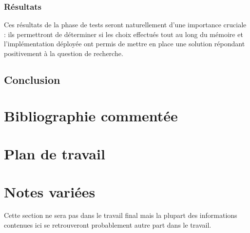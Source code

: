 \documentclass[11pt]{article}
\begin{document}
\subsubsection{Résultats}
Ces résultats de la phase de tests seront naturellement d'une importance cruciale : ils permettront de déterminer si les choix effectués tout au long du mémoire et l'implémentation déployée ont permis de mettre en place une solution répondant positivement à la question de recherche.
\subsection{Conclusion}

\section{Bibliographie commentée}

\section{Plan de travail}

\section{Notes variées}
Cette section ne sera pas dans le travail final mais la plupart des informations contenues ici se retrouveront probablement autre part dans le travail.
\end{document}
